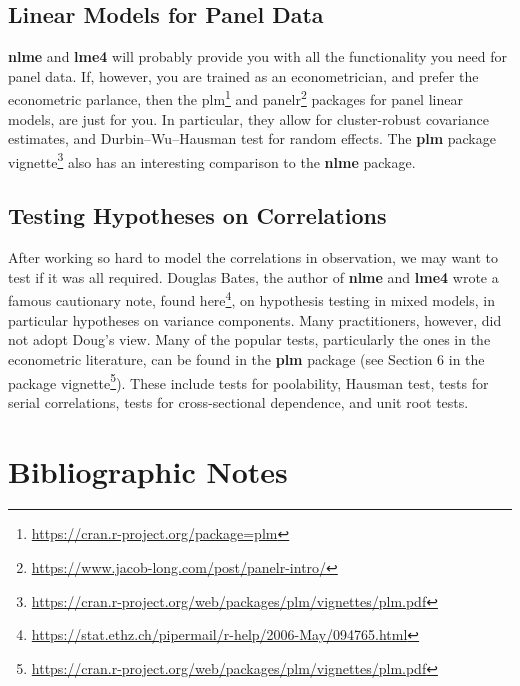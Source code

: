 \documentclass[]{book}
\renewcommand{\href}[2]{#2\footnote{\url{#1}}}
\theoremstyle{definition}
\theoremstyle{definition}
\theoremstyle{definition}
\theoremstyle{remark}
\begin{document}
\hypertarget{linear-models-for-panel-data}{%
\subsection{Linear Models for Panel Data}\label{linear-models-for-panel-data}}

\textbf{nlme} and \textbf{lme4} will probably provide you with all the functionality you need for panel data.
If, however, you are trained as an econometrician, and prefer the econometric parlance, then the \href{https://cran.r-project.org/package=plm}{plm} and \href{https://www.jacob-long.com/post/panelr-intro/}{panelr} packages for panel linear models, are just for you.
In particular, they allow for cluster-robust covariance estimates, and Durbin--Wu--Hausman test for random effects.
The \textbf{plm} \href{https://cran.r-project.org/web/packages/plm/vignettes/plm.pdf}{package vignette} also has an interesting comparison to the \textbf{nlme} package.

\hypertarget{testing-hypotheses-on-correlations}{%
\subsection{Testing Hypotheses on Correlations}\label{testing-hypotheses-on-correlations}}

After working so hard to model the correlations in observation, we may want to test if it was all required.
Douglas Bates, the author of \textbf{nlme} and \textbf{lme4} wrote a famous cautionary note, \href{https://stat.ethz.ch/pipermail/r-help/2006-May/094765.html}{found here}, on hypothesis testing in mixed models, in particular hypotheses on variance components.
Many practitioners, however, did not adopt Doug's view.
Many of the popular tests, particularly the ones in the econometric literature, can be found in the \textbf{plm} package (see Section 6 in the \href{https://cran.r-project.org/web/packages/plm/vignettes/plm.pdf}{package vignette}).
These include tests for poolability, Hausman test, tests for serial correlations, tests for cross-sectional dependence, and unit root tests.

\hypertarget{bibliographic-notes-6}{%
\section{Bibliographic Notes}\label{bibliographic-notes-6}}
\end{document}
